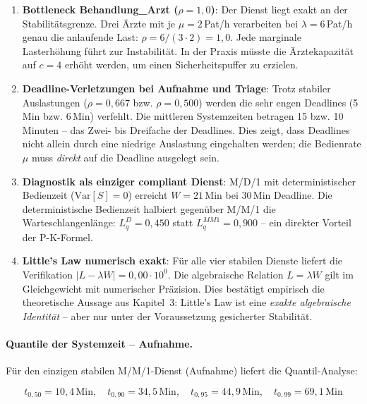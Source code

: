 ﻿\documentclass[a4paper,12pt]{report}
\theoremstyle{definition}
\begin{document}
\begin{enumerate}
	\item[-] \textbf{Bottleneck Behandlung\_Arzt ($\rho = 1{,}0$)}: Der
	Dienst liegt exakt an der Stabilitätsgrenze. Drei Ärzte mit je
	$\mu = 2$\,Pat/h verarbeiten bei $\lambda = 6$\,Pat/h genau
	die anlaufende Last: $\rho = 6/(3 \cdot 2) = 1{,}0$.
	Jede marginale Lasterhöhung führt zur Instabilität.
	In der Praxis müsste die Ärztekapazität auf $c=4$ erhöht werden,
	um einen Sicherheitspuffer zu erzielen.
	
	\item[-] \textbf{Deadline-Verletzungen bei Aufnahme und Triage}:
	Trotz stabiler Auslastungen ($\rho = 0{,}667$ bzw. $\rho = 0{,}500$)
	werden die sehr engen Deadlines (5\,Min bzw. 6\,Min) verfehlt.
	Die mittleren Systemzeiten betragen 15 bzw. 10\,Minuten --
	das Zwei- bis Dreifache der Deadlines. Dies zeigt, dass Deadlines
	nicht allein durch eine niedrige Auslastung eingehalten werden;
	die Bedienrate $\mu$ muss \emph{direkt} auf die Deadline ausgelegt sein.
	
	\item[-] \textbf{Diagnostik als einziger compliant Dienst}: M/D/1
	mit deterministischer Bedienzeit ($\mathrm{Var}[S]=0$) erreicht
	$W = 21$\,Min bei 30\,Min Deadline. Die deterministische Bedienzeit
	halbiert gegenüber M/M/1 die Warteschlangenlänge:
	$L_q^{D} = 0{,}450$ statt $L_q^{MM1} = 0{,}900$ -- ein direkter
	Vorteil der P-K-Formel.
	
	\item[-] \textbf{Little's Law numerisch exakt}:
	Für alle vier stabilen Dienste liefert die Verifikation
	$|L - \lambda W| = 0{,}00 \cdot 10^0$. Die algebraische
	Relation $L = \lambda W$ gilt im Gleichgewicht mit numerischer
	Präzision. Dies bestätigt empirisch die theoretische Aussage aus
	Kapitel~3: Little's Law ist eine \emph{exakte algebraische Identität}
	-- aber nur unter der Voraussetzung gesicherter Stabilität.
\end{enumerate}

\paragraph{Quantile der Systemzeit -- Aufnahme.}
Für den einzigen stabilen M/M/1-Dienst (Aufnahme) liefert die Quantil-Analyse:

\begin{equation}
	t_{0{,}50} = 10{,}4\,\text{Min}, \quad
	t_{0{,}90} = 34{,}5\,\text{Min}, \quad
	t_{0{,}95} = 44{,}9\,\text{Min}, \quad
	t_{0{,}99} = 69{,}1\,\text{Min}
\end{equation}
\end{document}
